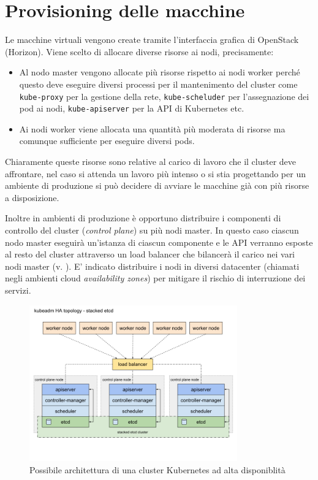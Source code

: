 \documentclass[12pt,a4paper,openright,twoside]{book}
\begin{document}
\section{Provisioning delle macchine}
Le macchine virtuali vengono create tramite l'interfaccia grafica di OpenStack (Horizon). Viene scelto di allocare diverse risorse ai nodi, precisamente: 
\begin{itemize}
    \item Al nodo master vengono allocate più risorse rispetto ai nodi worker perché questo deve eseguire diversi processi per il mantenimento del cluster
        come \texttt{kube-proxy} per la gestione della rete, \texttt{kube-scheluder} per l'assegnazione dei pod ai nodi, \texttt{kube-apiserver} per la API di Kubernetes etc.
    \item Ai nodi worker viene allocata una quantità più moderata di risorse ma comunque sufficiente per eseguire diversi pods. 
\end{itemize}
Chiaramente queste risorse sono relative al carico di lavoro che il cluster deve affrontare, nel caso si attenda un lavoro più intenso o si stia progettando per un ambiente di produzione
si può decidere di avviare le macchine già con più risorse a disposizione.

Inoltre in ambienti di produzione è opportuno distribuire i componenti di controllo del cluster (\textit{control plane}) su più nodi master. In questo caso ciascun nodo master eseguirà un'istanza
di ciascun componente e le API verranno esposte al resto del cluster attraverso un load balancer che bilancerà il carico nei vari nodi master (v. ). E' indicato distribuire i nodi in diversi datacenter 
(chiamati negli ambienti cloud \textit{availability zones}) per mitigare il rischio di interruzione dei servizi\cite{kubernetes}.
%
\begin{figure}[!hbt]
    \centering
    \includegraphics[width=0.8\textwidth]{figures/kube-ha-topo.png}
    \caption{Possibile architettura di una cluster Kubernetes ad alta disponiblità}
    \label{fig:kube-ha-topo}
\end{figure}
%
\end{document}
